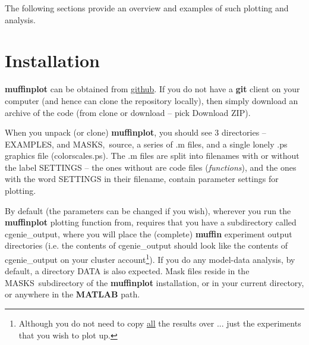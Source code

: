 \documentclass[11pt,fleqn]{book} %
\begin{document}
The following sections provide an overview and examples of such plotting and analysis.


\section{Installation}

\textbf{muffinplot} can be obtained from \href{https://github.com/derpycode/muffinplot\#https://github.com/derpycode/muffinplot}{github}. If you do not have a \textbf{git} client on your computer (and hence can clone the repository locally), then simply download an archive of the code (from \footnotesize\textsf{\textcolor[rgb]{0,0.501961,0}{clone or download }}\normalsize -- pick \textsf{\footnotesize Download ZIP}).

When you unpack (or clone) \textbf{muffinplot}, you should see 3 directories -- \footnotesize\textsf{EXAMPLES}\normalsize, and \footnotesize\textsf{MASKS}\normalsize,\ \footnotesize\textsf{source}\normalsize, a series of \footnotesize\textsf{.m }\normalsize files, and a single lonely \footnotesize\textsf{.ps }\normalsize graphics file (\footnotesize\textsf{colorscales.ps}\normalsize). The \footnotesize\textsf{.m }\normalsize files are split into filenames with or without the label \footnotesize\textsf{SETTINGS }\normalsize -- the ones without are code files (\textit{functions}), and the ones with the word \footnotesize\textsf{SETTINGS }\normalsize in their filename, contain parameter settings for plotting.

By default (the parameters can be changed if you wish), wherever you run the \textbf{muffinplot} plotting function from, requires that you have a subdirectory called \footnotesize\textsf{cgenie\_output}\normalsize, where you will place the (complete) \textbf{muffin} experiment output directories (i.e. the contents of \footnotesize\textsf{cgenie\_output }\normalsize should look like the contents of \footnotesize\textsf{cgenie\_output }\normalsize on your cluster account\footnote{Although you do not need to copy \uline{all} the results over ... just the experiments that you wish to plot up.}). If you do any model-data analysis, by default, a directory \footnotesize\textsf{DATA }\normalsize is also expected. Mask files reside in the \footnotesize\textsf{MASKS}\normalsize\ subdirectory of the \textbf{muffinplot} installation, or in your current directory, or anywhere in the \textbf{MATLAB} path.
\end{document}
